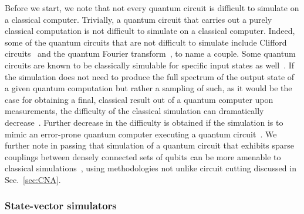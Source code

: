 Before we start, we note that not every quantum circuit is difficult to simulate on a classical computer. Trivially, a quantum circuit that carries out a purely classical computation is not difficult to simulate on a classical computer. Indeed, some of the quantum circuits that are not difficult to simulate include Clifford circuits~\cite{gottesman1998heisenberg,aaronson2004improved,garcia2014simulation} and the quantum Fourier transform~\cite{aharonov2006quantum,yoran2007efficient}, to name a couple. Some quantum circuits are known to be classically simulable for specific input states as well~\cite{garcia2014simulation}. If the simulation does not need to produce the full spectrum of the output state of a given quantum computation but rather a sampling of such, as it would be the case for obtaining a final, classical result out of a quantum computer upon measurements, the difficulty of the classical simulation can dramatically decrease~\cite{hillmich2020just}. Further decrease in the difficulty is obtained if the simulation is to mimic an error-prone quantum computer executing a quantum circuit~\cite{hillmich2022approximating}. We further note in passing that simulation of a quantum circuit that exhibits sparse couplings between densely connected sets of qubits can be more amenable to classical simulations~\cite{fatima2021faster}, using methodologies not unlike circuit cutting discussed in Sec.~\ref{sec:CNA}.

\subsubsection{State-vector simulators}

